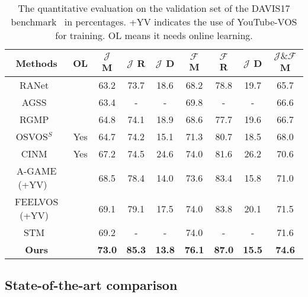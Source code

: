 \documentclass{article}
\begin{document}
\begin{table}
  \caption{The quantitative evaluation on the validation set of the DAVIS17 benchmark~\cite{pont-tuset_2017_2018} in percentages. +YV indicates the use of YouTube-VOS for training. OL means it needs online learning.}
  \label{tbl:DAVIS17}
  \centering
  \begin{tabular}{c|c|cccccc|c}
        \toprule
        Methods & OL & $\mathcal{J}$ M & $\mathcal{J}$ R & $\mathcal{J}$ D & $\mathcal{F}$ M & $\mathcal{F}$ R & $\mathcal{J}$ D & $\mathcal{J} \& \mathcal{F}$ M\\
\midrule
         RANet~\cite{wang_ranet_2019} &      & 63.2 & 73.7 & 18.6 & 68.2 & 78.8 & 19.7 & 65.7\\
         AGSS~\cite{lin_agss-vos_2019} &     & 63.4 & -    & -    & 69.8 & -    & -    & 66.6\\
         RGMP~\cite{oh_fast_2018} &          & 64.8 & 74.1 & 18.9 & 68.6 & 77.7 & 19.6 & 66.7\\
         OSVOS$^S$~\cite{maninis_video_2019} & Yes & 64.7 & 74.2 & 15.1 & 71.3 & 80.7 & 18.5 & 68.0\\
         CINM~\cite{bao_cnn_2018} & Yes      & 67.2 & 74.5 & 24.6 & 74.0 & 81.6 & 26.2 & 70.6\\
         A-GAME (+YV) ~\cite{johnander2019generative} & & 68.5 & 78.4 & 14.0 & 73.6 & 83.4 & 15.8 & 71.0\\
         FEELVOS (+YV)~\cite{voigtlaender2019feelvos} & & 69.1 & 79.1 & 17.5 & 74.0 & 83.8 & 20.1 &  71.5\\
         STM~\cite{oh_video_2019} &          & 69.2 & -    & -    & 74.0 & -    & -    & 71.6\\
         \textbf{Ours} &  & \textbf{73.0} & \textbf{85.3} & \textbf{13.8} & \textbf{76.1} & \textbf{87.0} & \textbf{15.5} & \textbf{74.6} \\
        \bottomrule
    \end{tabular}

\end{table}

\subsection{State-of-the-art comparison}
\end{document}
